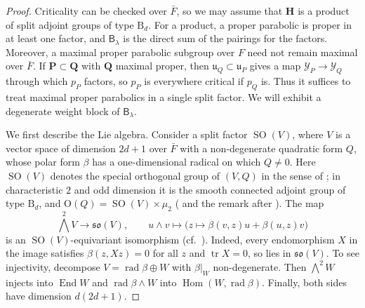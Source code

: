 \documentclass[11pt,reqno]{amsart}
\numberwithin{equation}{section}
\theoremstyle{plain}
\theoremstyle{definition}
\theoremstyle{remark}
\theoremstyle{plain}
\newcommand{\bG}{\mathbf{G}}     %
\newcommand{\bP}{\mathbf{P}}     %
\newcommand{\bQ}{\mathbf{Q}}     %
\newcommand{\bH}{\mathbf{H}}     %
\newcommand{\uu}{\mathfrak{u}}   %
\DeclareMathOperator{\tr}{tr}
\DeclareMathOperator{\Hom}{Hom}
\DeclareMathOperator{\SO}{SO}
\DeclareMathOperator{\rad}{rad}
\DeclareMathOperator{\End}{End}
\newcommand{\lf}{\lambda}
\newcommand{\Bf}{\mathsf{B}}
\newcommand{\Inc}{\mathcal{Y}}
\begin{document}
\begin{proof}
Criticality can be checked over $\bar F$, so we may assume that
$\bH$ is a product of split adjoint groups of type $\mathrm B_d$.
For a product, a proper parabolic is proper in at least one factor,
and $\Bf_\lf$ is the direct sum of the pairings for the factors.
Moreover, a maximal proper parabolic subgroup over $F$ need not remain
maximal over $\bar F$. If $\bP\subset\bQ$ with $\bQ$ maximal proper, then
$\uu_Q\subset\uu_P$ gives a map $\Inc_P\to\Inc_Q$ through which
$p_P$ factors, so $p_P$ is everywhere critical if $p_Q$ is. Thus it suffices to treat maximal proper parabolics
in a single split factor. We will exhibit a degenerate weight block
of $\Bf_\lf$.

We first describe the Lie algebra. Consider a split factor
$\SO(V)$, where $V$ is a vector space of dimension $2d+1$ over $\bar F$
with a non-degenerate quadratic form $Q$, whose polar form $\beta$ has
a one-dimensional radical on which $Q\ne0$. Here $\SO(V)$ denotes the
special orthogonal group of $(V,Q)$ in the sense of
\cite[Definition~C.2.10]{MR3362641}; in characteristic $2$ and odd
dimension it is the smooth connected adjoint group of type $\mathrm B_d$,
and $\mathrm O(Q)=\SO(V)\times\mu_2$ (\cite[Theorem~C.2.11]{MR3362641} and the remark after \cite[Definition~C.2.10]{MR3362641}). The map
\[
\bigwedge^2V\to\mathfrak{so}(V),\qquad
u\wedge v\mapsto\bigl(z\mapsto\beta(v,z)u+\beta(u,z)v\bigr)
\]
is an $\SO(V)$-equivariant isomorphism (cf.~\cite[\S\S3--4]{MR2558787}).
Indeed, every endomorphism $X$ in the image satisfies $\beta(z,Xz)=0$
for all $z$ and $\tr X=0$, so lies in $\mathfrak{so}(V)$.
To see injectivity, decompose $V=\rad\beta\oplus W$ with $\beta|_W$
non-degenerate. Then $\bigwedge^2W$ injects into $\End W$ and
$\rad\beta\wedge W$ into $\Hom(W,\rad\beta)$. Finally, both sides
have dimension $d(2d+1)$.


\end{proof}
\end{document}
